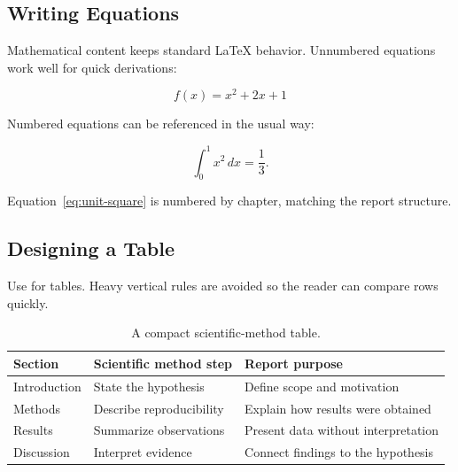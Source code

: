 \subsection{Writing Equations}

Mathematical content keeps standard LaTeX behavior. Unnumbered equations work
well for quick derivations:

\[
  f(x) = x^2 + 2x + 1
\]

Numbered equations can be referenced in the usual way:

\begin{equation}
  \int_0^1 x^2\,dx = \frac{1}{3}.
  \label{eq:unit-square}
\end{equation}

Equation~\ref{eq:unit-square} is numbered by chapter, matching the report
structure.

\subsection{Designing a Table}

Use  for tables. Heavy vertical rules are avoided so the
reader can compare rows quickly.

\begin{table}[H]
  \centering
  \caption{A compact scientific-method table.}
  \label{tab:method}
  \begin{tabularx}{\linewidth}{@{}lXX@{}}
    \toprule
    Section & Scientific method step & Report purpose \\
    \midrule
    Introduction & State the hypothesis & Define scope and motivation \\
    Methods & Describe reproducibility & Explain how results were obtained \\
    Results & Summarize observations & Present data without interpretation \\
    Discussion & Interpret evidence & Connect findings to the hypothesis \\
    \bottomrule
  \end{tabularx}
\end{table}
